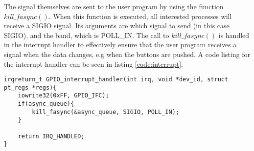 The signal themselves are sent to the user program by using the function $kill\_fasync()$. When this function is executed, all interested processes will receive a SIGIO signal. Its arguments are which signal to send (in this case SIGIO), and the band, which is POLL\_IN. The call to $kill\_fasync()$ is handled in the interrupt handler to effectively ensure that the user program receives a signal when the data changes, e.g when the buttons are pushed. A code listing for the interrupt handler can be seen in listing \ref{code:interrupt}.


\begin{lstlisting}[caption=Interrupt handler, label=code:interrupt]
irqreturn_t GPIO_interrupt_handler(int irq, void *dev_id, struct pt_regs *regs){
    iowrite32(0xFF, GPIO_IFC);
    if(async_queue){
        kill_fasync(&async_queue, SIGIO, POLL_IN);
    }
    
    return IRQ_HANDLED;
}
\end{lstlisting}



